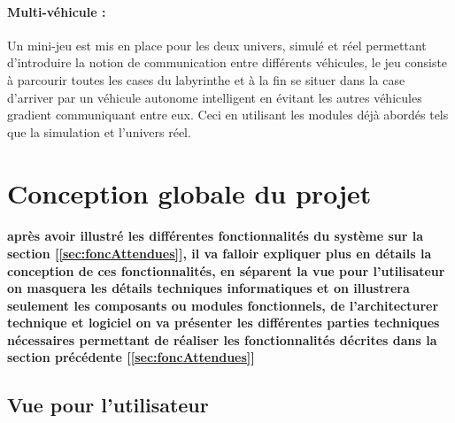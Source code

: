 \paragraph{Multi-véhicule :} Un mini-jeu est mis en place pour les deux univers, simulé et réel permettant d'introduire la notion de communication entre différents véhicules, le jeu consiste à parcourir toutes les cases du labyrinthe et à la fin se situer dans la case d'arriver par un véhicule autonome intelligent en évitant les autres véhicules gradient communiquant entre eux. Ceci en utilisant les modules déjà abordés tels que la simulation et l'univers réel.



\section{Conception globale du projet} \label{sec:conception}
\paragraph{
   après avoir illustré les différentes fonctionnalités du système sur la
section [\ref{sec:foncAttendues}], il va falloir expliquer plus en détails
la conception de ces fonctionnalités, en séparent la vue pour l'utilisateur
on masquera les détails techniques informatiques et on illustrera seulement
les composants ou modules fonctionnels, de l'architecturer technique et
logiciel on va présenter les différentes parties techniques nécessaires
permettant de réaliser les fonctionnalités décrites dans la section
précédente [\ref{sec:foncAttendues}]}

\subsection{Vue pour l’utilisateur} \label{sec:vueUtil}
   
